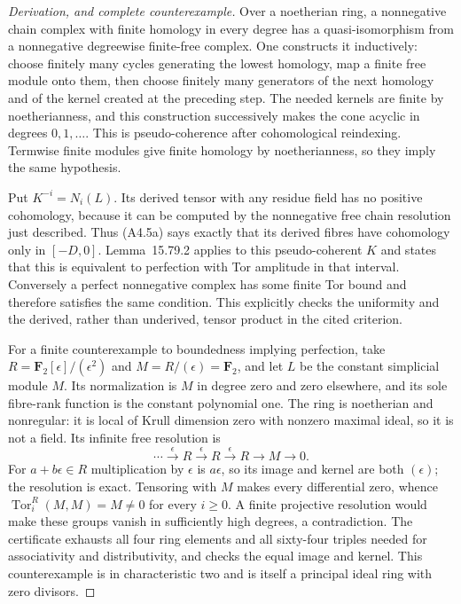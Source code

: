 \begin{proof}[Derivation, and complete counterexample]
Over a noetherian ring, a nonnegative chain complex with finite
homology in every degree has a quasi-isomorphism from a
nonnegative degreewise finite-free complex.  One constructs it
inductively: choose finitely many cycles generating the lowest
homology, map a finite free module onto them, then choose
finitely many generators of the next homology and of the kernel
created at the preceding step.  The needed kernels are finite
by noetherianness, and this construction successively makes the
cone acyclic in degrees $0,1,\ldots$.  This is pseudo-coherence
after cohomological reindexing.  Termwise finite modules give
finite homology by noetherianness, so they imply the same
hypothesis.

Put $K^{-i}=N_i(L)$.  Its derived tensor with any residue field
has no positive cohomology, because it can be computed by the
nonnegative free chain resolution just described.  Thus
(A4.5a) says exactly that its derived fibres have cohomology only
in $[-D,0]$.  Lemma~15.79.2 applies to this pseudo-coherent $K$
and states that this is equivalent to perfection with Tor
amplitude in that interval.  Conversely a perfect nonnegative
complex has some finite Tor bound and therefore satisfies the
same condition.  This explicitly checks the uniformity and the
derived, rather than underived, tensor product in the cited
criterion.

For a finite counterexample to boundedness implying perfection,
take $R=\mathbf F_2[\epsilon]/(\epsilon^2)$ and
$M=R/(\epsilon)=\mathbf F_2$, and let $L$ be the constant
simplicial module $M$.  Its normalization is $M$ in degree zero
and zero elsewhere, and its sole fibre-rank function is the
constant polynomial one.  The ring is noetherian and nonregular:
it is local of Krull dimension zero with nonzero maximal ideal,
so it is not a field.  Its infinite free resolution is
\[
 \cdots\xrightarrow{\epsilon}R
       \xrightarrow{\epsilon}R
       \xrightarrow{\epsilon}R\longrightarrow M\longrightarrow0.
\]
For $a+b\epsilon\in R$ multiplication by $\epsilon$ is
$a\epsilon$, so its image and kernel are both $(\epsilon)$;
the resolution is exact.  Tensoring with $M$ makes every
differential zero, whence
$\operatorname{Tor}_i^R(M,M)=M\ne0$ for every $i\geq0$.
A finite projective resolution would make these groups vanish
in sufficiently high degrees, a contradiction.  The certificate
exhausts all four ring elements and all sixty-four triples needed
for associativity and distributivity, and checks the equal image
and kernel.  This counterexample is in characteristic two and
is itself a principal ideal ring with zero divisors.
\end{proof}

